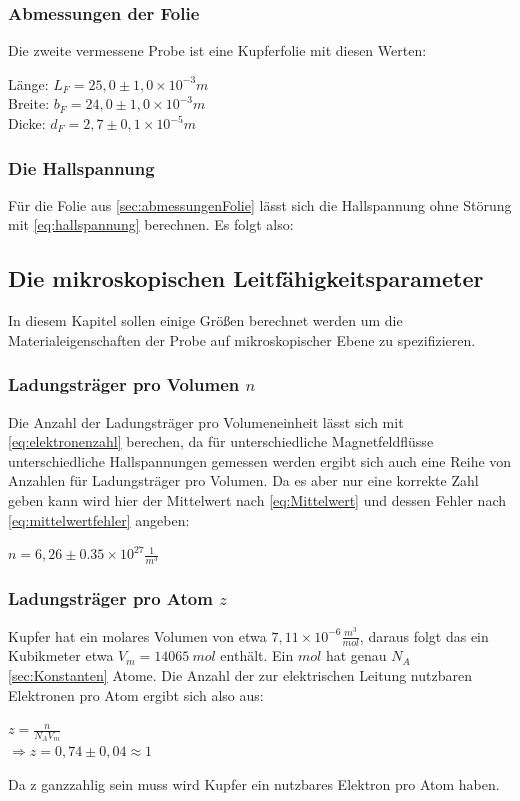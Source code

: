 \subsubsection{Abmessungen der Folie}
\label{sec:abmessungenFolie}
Die zweite vermessene Probe ist eine Kupferfolie mit diesen Werten:
\begin{center}
    Länge: $L_F=25,0\pm1,0\times 10^{-3} m$\\
    Breite: $b_F=24,0\pm1,0\times 10^{-3} m$\\
    Dicke: $d_F=2,7\pm0,1\times 10^{-5} m$
\end{center} 
\subsubsection{Die Hallspannung}
Für die Folie aus \autoref{sec:abmessungenFolie} lässt sich die Hallspannung ohne Störung mit 
\autoref{eq:hallspannung} berechnen. Es folgt also:


\subsection{Die mikroskopischen Leitfähigkeitsparameter}
\label{sec:leitfaehigkeitsparameter}
In diesem Kapitel sollen einige Größen berechnet werden um die Materialeigenschaften der Probe
auf mikroskopischer Ebene zu spezifizieren.
\subsubsection{Ladungsträger pro Volumen $n$}
\label{sec:ladungstraegerVolumen}
Die Anzahl der Ladungsträger pro Volumeneinheit lässt sich mit \autoref{eq:elektronenzahl} berechen, da 
für unterschiedliche Magnetfeldflüsse unterschiedliche Hallspannungen gemessen werden ergibt sich auch
eine Reihe von Anzahlen für Ladungsträger pro Volumen. Da es aber nur eine korrekte Zahl geben kann wird hier
der Mittelwert nach \autoref{eq:Mittelwert} und dessen Fehler nach \autoref{eq:mittelwertfehler} angeben:
\begin{center}
    $n=6,26\pm0.35 \times 10^{27} \frac{1}{m^3}$
\end{center}
\subsubsection{Ladungsträger pro Atom $z$}
\label{sec:ladungstraegerAtom}
Kupfer hat ein molares Volumen von etwa $7,11 \times 10^{-6} \frac{m^3}{mol}$, daraus folgt das ein
 Kubikmeter etwa $V_m=\SI{14065}{mol}$ enthält. Ein $mol$ hat genau $N_A$ \autoref{sec:Konstanten} Atome.
 Die Anzahl der zur elektrischen Leitung nutzbaren Elektronen pro Atom ergibt sich also aus:
 \begin{center}
     $z=\frac{n}{N_A V_m}$\\
     $\Rightarrow z=0,74\pm0,04 \approx 1$
 \end{center}
 Da z ganzzahlig sein muss wird Kupfer ein nutzbares Elektron pro Atom haben.

